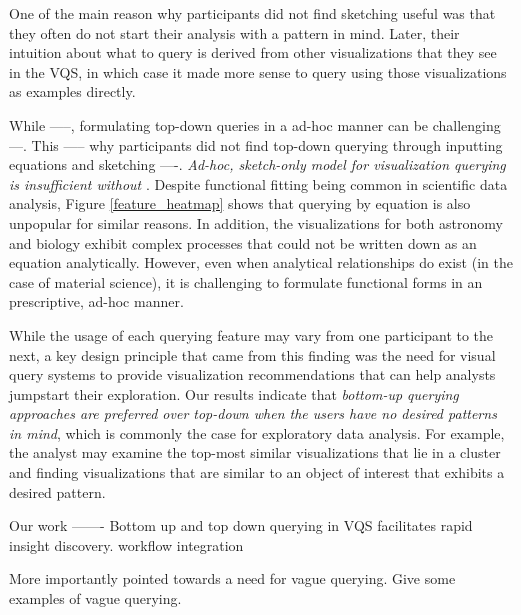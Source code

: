 \par One of the main reason why participants did not find sketching useful was that they often do not start their analysis with a pattern in mind. Later, their intuition about what to query is derived from other visualizations that they see in the VQS, in which case it made more sense to query using those visualizations as examples directly. 
\par While -----, formulating top-down queries in a ad-hoc manner can be challenging ---. This ----- why participants did not find top-down querying through inputting equations and sketching ----. \emph{Ad-hoc, sketch-only model for visualization querying is insufficient without }. Despite functional fitting being common in scientific data analysis, Figure \ref{feature_heatmap} shows that querying by equation is also unpopular for similar reasons. In addition, the visualizations for both astronomy and biology exhibit complex processes that could not be written down as an equation analytically. However, even when analytical relationships do exist (in the case of material science), it is challenging to formulate functional forms in an prescriptive, ad-hoc manner. 
\par While the usage of each querying feature may vary from one participant to the next, a key design principle that came from this finding was the need for visual query systems to provide visualization recommendations that can help analysts jumpstart their exploration. Our results indicate that \emph{bottom-up querying approaches are preferred over top-down when the users have no desired patterns in mind}, which is commonly the case for exploratory data analysis. For example, the analyst may examine the top-most similar visualizations that lie in a cluster and finding visualizations that are similar to an object of interest that exhibits a desired pattern. 
\par Our \zv work ------- Bottom up and top down querying in VQS facilitates rapid insight discovery. 
workflow integration 

More importantly pointed towards a need for vague querying. Give some examples of vague querying.

